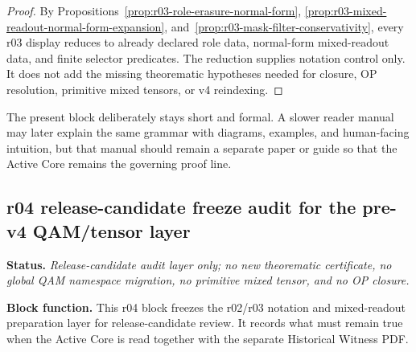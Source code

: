 \begin{proof}
By Propositions~\ref{prop:r03-role-erasure-normal-form}, \ref{prop:r03-mixed-readout-normal-form-expansion}, and~\ref{prop:r03-mask-filter-conservativity}, every r03 display reduces to already declared role data, normal-form mixed-readout data, and finite selector predicates.  The reduction supplies notation control only.  It does not add the missing theorematic hypotheses needed for closure, OP resolution, primitive mixed tensors, or v4 reindexing.
\end{proof}

\begin{remark}\label{rem:r03-reader-manual-placement}
The present block deliberately stays short and formal.  A slower reader manual may later explain the same grammar with diagrams, examples, and human-facing intuition, but that manual should remain a separate paper or guide so that the Active Core remains the governing proof line.
\end{remark}



\subsection*{r04 release-candidate freeze audit for the pre-v4 QAM/tensor layer}
\label{subsec:r04-release-candidate-freeze-audit-qam-tensor}

\noindent\textbf{Status.} \emph{Release-candidate audit layer only; no new theorematic certificate, no global QAM namespace migration, no primitive mixed tensor, and no OP closure.}\par
\noindent\textbf{Block function.} This r04 block freezes the r02/r03 notation and mixed-readout preparation layer for release-candidate review.  It records what must remain true when the Active Core is read together with the separate Historical Witness PDF.

